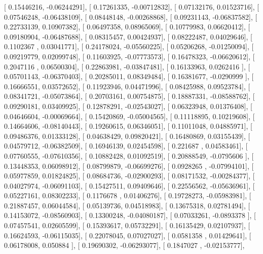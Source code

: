 \documentclass{article}
\begin{document}
       [ 0.15446216, -0.06244291],
       [ 0.17261335, -0.00712832],
       [ 0.07132176,  0.01523716],
       [ 0.07546248, -0.06438109],
       [ 0.08448148, -0.00268868],
       [ 0.09231143, -0.06837582],
       [ 0.22733139,  0.10907382],
       [ 0.06497358,  0.08965069],
       [ 0.10779983,  0.06620412],
       [ 0.09180904, -0.06487688],
       [ 0.08315457,  0.00424937],
       [ 0.08222487,  0.04029646],
       [ 0.1102367 ,  0.03041771],
       [ 0.24178024, -0.05560225],
       [ 0.05206268, -0.01250094],
       [ 0.09219779,  0.02099748],
       [ 0.11603925, -0.07773573],
       [ 0.16478323, -0.06620612],
       [ 0.2047116 ,  0.06500304],
       [ 0.22863981, -0.03847481],
       [ 0.16133963,  0.0262416 ],
       [ 0.05701143, -0.06370403],
       [ 0.20285011,  0.08349484],
       [ 0.16381677, -0.0290999 ],
       [ 0.16666551,  0.03572652],
       [ 0.11923946,  0.04471996],
       [ 0.08425988,  0.09523784],
       [ 0.08341721, -0.05073864],
       [ 0.20703161,  0.00754875],
       [ 0.18887331, -0.08588762],
       [ 0.09290181,  0.03409925],
       [ 0.12878291, -0.02543027],
       [ 0.06323948,  0.01376408],
       [ 0.04646604, -0.00069664],
       [ 0.15420869, -0.05004565],
       [ 0.11118895,  0.10219608],
       [ 0.14664606, -0.08140443],
       [ 0.19260615,  0.06346051],
       [ 0.11011048,  0.04885971],
       [ 0.09486376,  0.01333128],
       [ 0.04638429,  0.09820421],
       [ 0.16480869,  0.03155439],
       [ 0.04579712, -0.06382509],
       [ 0.16946139,  0.02454598],
       [ 0.221687  ,  0.04583461],
       [ 0.07760555, -0.07610356],
       [ 0.10882428,  0.01092519],
       [ 0.20888549, -0.0795606 ],
       [ 0.13448353,  0.06098912],
       [ 0.08799879, -0.06699276],
       [ 0.0928265 , -0.07994101],
       [ 0.05977859,  0.01824825],
       [ 0.08684736, -0.02900293],
       [ 0.08171532, -0.00284377],
       [ 0.04027974, -0.06091103],
       [ 0.15427511,  0.09409646],
       [ 0.22556562, -0.05636961],
       [ 0.05227161,  0.08302233],
       [ 0.1176678 ,  0.01406276],
       [ 0.19728273, -0.05983981],
       [ 0.21887457,  0.06044584],
       [ 0.05139736,  0.04518983],
       [ 0.13675318,  0.02781494],
       [ 0.14153072, -0.08560903],
       [ 0.13300248, -0.04080187],
       [ 0.07033261, -0.0893378 ],
       [ 0.07457541,  0.02605599],
       [ 0.15393617,  0.05732291],
       [ 0.16135429,  0.02107937],
       [ 0.16624593, -0.06115035],
       [ 0.22078045,  0.07027027],
       [ 0.0581358 ,  0.01429641],
       [ 0.06178008,  0.050884  ],
       [ 0.19690302, -0.06293077],
       [ 0.1847027 , -0.02153777],
\end{document}
